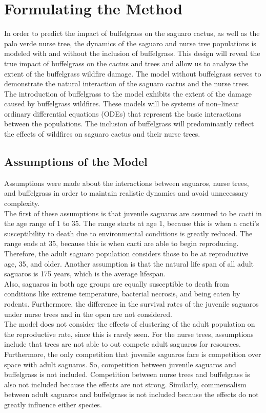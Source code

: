\documentclass[a4paper]{article}
\begin{document}
\section{Formulating the Method}
In order to predict the impact of buffelgrass on the saguaro cactus, as well as the palo verde nurse tree, the dynamics of the saguaro and nurse tree populations is modeled with and without the inclusion of buffelgrass. This design will reveal the true impact of buffelgrass on the cactus and trees and allow us to analyze the extent of the buffelgrass wildfire damage. The model without buffelgrass serves to demonstrate the natural interaction of the saguaro cactus and the nurse trees. The introduction of buffelgrass to the model exhibits the extent of the damage caused by buffelgrass wildfires. These models will be systems of non--linear ordinary differential equations (ODEs) that represent the basic interactions between the populations. The inclusion of buffelgrass will predominantly reflect the effects of wildfires on saguaro cactus and their nurse trees.
\subsection{Assumptions of the Model}
Assumptions were made about the interactions between saguaros, nurse trees, and buffelgrass in order to maintain realistic dynamics and avoid unnecessary complexity.\\

The first of these assumptions is that juvenile saguaros are assumed to be cacti in the age range of 1 to 35. The range starts at age 1, because this is when a cacti's susceptibility to death due to environmental conditions is greatly reduced. The range ends at 35, because this is when cacti are able to begin reproducing. Therefore, the adult saguaro population considers those to be at reproductive age, 35, and older. Another assumption is that the natural life span of all adult saguaros is 175 years, which is the average lifespan.\\

Also, saguaros in both age groups are equally susceptible to death from conditions like extreme temperature, bacterial necrosis, and being eaten by rodents. Furthermore, the difference in the survival rates of the juvenile saguaros under nurse trees and in the open are not considered.\\

The model does not consider the effects of clustering of the adult population on the reproductive rate, since this is rarely seen. For the nurse trees, assumptions include that trees are not able to out compete adult saguaros for resources. Furthermore, the only competition that juvenile saguaros face is competition over space with adult saguaros. So, competition between juvenile saguaros and buffelgrass is not included. Competition between nurse trees and buffelgrass is also not included because the effects are not strong. Similarly, commensalism between adult saguaros and buffelgrass is not included because the effects do not greatly influence either species.
\end{document}
